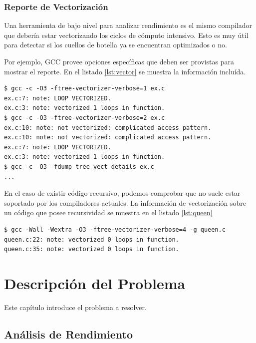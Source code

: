 \documentclass[a4paper]{report}
\begin{document}
\subsection{Reporte de Vectorización}

Una herramienta de bajo nivel para analizar rendimiento es el mismo compilador
que debería estar vectorizando los ciclos de cómputo intensivo. Esto es muy
útil para detectar si los cuellos de botella ya se encuentran optimizados o no.

\bigskip

Por ejemplo, GCC provee opciones específicas que deben ser provistas para mostrar el reporte.
En el listado \ref{lst:vector} se muestra la información incluída.

\begin{lstlisting}[caption={Información de Vectorización},label={lst:vector}] 
$ gcc -c -O3 -ftree-vectorizer-verbose=1 ex.c
ex.c:7: note: LOOP VECTORIZED.
ex.c:3: note: vectorized 1 loops in function.
$ gcc -c -O3 -ftree-vectorizer-verbose=2 ex.c
ex.c:10: note: not vectorized: complicated access pattern.
ex.c:10: note: not vectorized: complicated access pattern.
ex.c:7: note: LOOP VECTORIZED.
ex.c:3: note: vectorized 1 loops in function.
$ gcc -c -O3 -fdump-tree-vect-details ex.c
...
\end{lstlisting}

En el caso de existir código recursivo, podemos comprobar que no suele estar soportado por los compiladores actuales.
La información de vectorización sobre un código que posee recursividad se muestra en el listado \ref{lst:queen}

\begin{lstlisting}[caption={Vectorización de Código Recursivo},label={lst:queen}]
$ gcc -Wall -Wextra -O3 -ftree-vectorizer-verbose=4 -g queen.c
queen.c:22: note: vectorized 0 loops in function.
queen.c:35: note: vectorized 0 loops in function.
\end{lstlisting}

\chapter{Descripción del Problema} \label{Descripcion del Problema}

Este capítulo introduce el problema a resolver.

\section{Análisis de Rendimiento}
\end{document}
